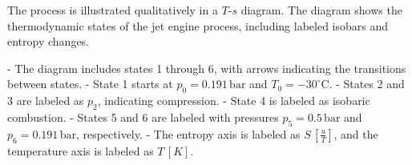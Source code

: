 The process is illustrated qualitatively in a \( T \)-\( s \) diagram. The diagram shows the thermodynamic states of the jet engine process, including labeled isobars and entropy changes.  

- The diagram includes states 1 through 6, with arrows indicating the transitions between states.  
- State 1 starts at \( p_0 = 0.191 \, \text{bar} \) and \( T_0 = -30^\circ\text{C} \).  
- States 2 and 3 are labeled as \( p_2 \), indicating compression.  
- State 4 is labeled as isobaric combustion.  
- States 5 and 6 are labeled with pressures \( p_5 = 0.5 \, \text{bar} \) and \( p_6 = 0.191 \, \text{bar} \), respectively.  
- The entropy axis is labeled as \( S \, [\frac{u}{T}] \), and the temperature axis is labeled as \( T \, [K] \).